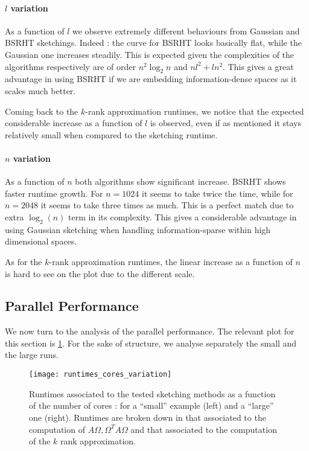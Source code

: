 \documentclass[a4paper, 12pt,oneside]{article}
\begin{document}
		\paragraph{$l$ variation}
		As a function of $l$ we observe extremely different behaviours from Gaussian and BSRHT sketchings. Indeed : the curve for BSRHT looks basically flat, while the Gaussian one increases steadily. This is expected given the complexities of the algorithms respectively are of order $n^2\log_2{n}$ and $nl^2 + ln^2$. This gives a great advantage in using BSRHT if we are embedding information-dense spaces as it scales much better.		

		Coming back to the $k$-rank approximation runtimes, we notice that the expected considerable increase as a function of $l$ is observed, even if as mentioned it stays relatively small when compared to the sketching runtime.
		\paragraph{$n$ variation}
		As a function of $n$ both algorithms show significant increase. BSRHT shows faster runtime growth. For $n=1024$ it seems to take twice the time, while for $n=2048$ it seems to take three times as much. This is a perfect match due to extra $\log_2(n)$ term in its complexity. This gives a considerable advantage in using Gaussian sketching when handling information-sparse within high dimensional spaces.

		As for the $k$-rank approximation runtimes, the linear increase as a function of $n$ is hard to see on the plot due to the different scale. 
        \subsection{Parallel Performance}
			We now turn to the analysis of the parallel performance. The relevant plot for this section is \ref{fig:runtimes-cores-variation}. For the sake of structure, we analyse separately the small and the large runs.
			\begin{figure}[htb]       
				\centering             
					\vspace{0em}
					\texttt{[image: runtimes\_cores\_variation]}
					\caption{Runtimes associated to the tested sketching methods as a function of the number of cores : for a ``small'' example (left) and a ``large'' one (right). Runtimes are broken down in that associated to the computation of $A\Omega,\Omega^T A\Omega$ and that associated to the computation of the $k$ rank approximation.}
					\label{fig:runtimes-cores-variation}
			\end{figure}
\end{document}
